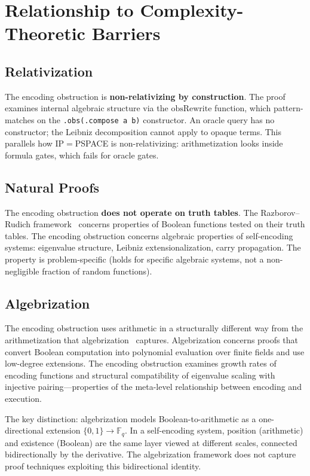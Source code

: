 \documentclass[11pt,a4paper]{article}
\theoremstyle{definition}
\theoremstyle{remark}
\newcommand{\obsRewrite}{\mathrm{obsRewrite}}
\begin{document}
\section{Relationship to Complexity-Theoretic Barriers}
\label{sec:barriers}

\subsection{Relativization}

The encoding obstruction is \textbf{non-relativizing by construction}. The
proof examines internal algebraic structure via the $\obsRewrite$ function,
which pattern-matches on the \texttt{.obs(.compose a b)} constructor. An
oracle query has no constructor; the Leibniz decomposition cannot apply to
opaque terms. This parallels how IP$=$PSPACE is non-relativizing:
arithmetization looks inside formula gates, which fails for oracle gates.

\subsection{Natural Proofs}

The encoding obstruction \textbf{does not operate on truth tables}. The
Razborov--Rudich framework~\cite{razborov1997} concerns properties of
Boolean functions tested on their truth tables. The encoding obstruction
concerns algebraic properties of self-encoding systems: eigenvalue
structure, Leibniz extensionalization, carry propagation. The property is
problem-specific (holds for specific algebraic systems, not a non-negligible
fraction of random functions).

\subsection{Algebrization}

The encoding obstruction uses arithmetic in a structurally different way
from the arithmetization that algebrization~\cite{aaronson2009} captures.
Algebrization concerns proofs that convert Boolean computation into
polynomial evaluation over finite fields and use low-degree extensions. The
encoding obstruction examines growth rates of encoding functions and
structural compatibility of eigenvalue scaling with injective
pairing---properties of the meta-level relationship between encoding and
execution.

The key distinction: algebrization models Boolean-to-arithmetic as a
one-directional extension $\{0,1\} \to \mathbb{F}_q$. In a self-encoding
system, position (arithmetic) and existence (Boolean) are the same layer
viewed at different scales, connected bidirectionally by the derivative. The
algebrization framework does not capture proof techniques exploiting this
bidirectional identity.
\end{document}
